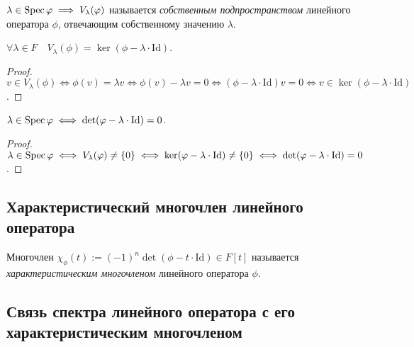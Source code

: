 \begin{definition}
    $\lambda \in \operatorname{\mathop{\mathrm{Spec}}} \varphi \implies V_\lambda(\varphi)$ называется \textit{собственным подпространством} линейного оператора $\phi$, отвечающим собственному значению $\lambda$.
\end{definition}

\begin{comment}
    $V_\lambda(\phi) \ \phi$-нивариантно, $\quad \phi\Big|_{V_{\lambda}(\phi)} = \lambda \cdot \mathrm{Id}\Big|_{V_\lambda(\phi)}$.
\end{comment}

\begin{proposal}
    $\forall \lambda \in F \quad V_\lambda(\phi) = \ker(\phi - \lambda \cdot \mathrm{Id})$.
\end{proposal}

\begin{proof}
    $v \in V_\lambda(\phi) \iff \phi(v) = \lambda v \iff \phi(v) - \lambda v = 0 \iff (\phi - \lambda \cdot \mathrm{Id}) v = 0 \iff v \in \ker(\phi - \lambda \cdot \mathrm{Id})$.
\end{proof}

\begin{corollary}
    $\lambda \in \operatorname{\mathop{\mathrm{Spec}}} \varphi \iff \det (\varphi - \lambda \cdot \mathrm{Id}) = 0$.
\end{corollary}

\begin{proof}
    $\lambda \in \operatorname{\mathop{\mathrm{Spec}}} \varphi \iff V_\lambda(\varphi) \neq \{0\} \iff \ker(\varphi - \lambda \cdot \mathrm{Id}) \neq \{0\} \iff \det(\varphi - \lambda \cdot \mathrm{Id}) = 0$.
\end{proof}

\subsection{Характеристический многочлен линейного оператора}

\begin{definition}
    Многочлен $\chi_\phi(t) := (-1)^n \det(\phi - t \cdot \mathrm{Id}) \in F[t]$ называется \textit{характеристическим многочленом} линейного оператора $\phi$.
\end{definition}


\subsection{Связь спектра линейного оператора с его характеристическим многочленом}

